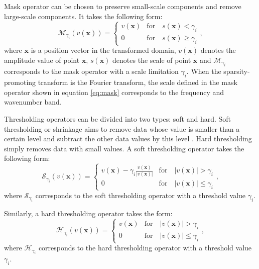 Mask operator can be chosen to preserve small-scale components and remove large-scale components. It takes the following form:
\begin{equation}
\label{eq:mask}
\mathbf{\mathcal{M}}_{\gamma_i}(v(\mathbf{x})) = \left\{ \begin{array}{ll}
v(\mathbf{x}) & \text{for}\quad  s(\mathbf{x}) < \gamma_i  \\
0	      & \text{for}\quad  s(\mathbf{x}) \ge \gamma_i
\end{array}\right.,
\end{equation}
where $\mathbf{x}$ is a position vector in the transformed domain, $v(\mathbf{x})$ denotes the amplitude value of point $\mathbf{x}$, $s(\mathbf{x})$ denotes the scale of point $\mathbf{x}$ and $\mathbf{\mathcal{M}}_{\gamma_i}$ corresponds to the mask operator with a scale limitation $\gamma_i$. When the sparsity-promoting transform is the Fourier transform, the scale defined in the mask operator shown in equation \ref{eq:mask} corresponds to the frequency and wavenumber band.

Thresholding operators can be divided into two types: soft and hard. Soft thresholding or shrinkage aims to remove data whose value is smaller than a certain level and subtract the other data values by this level \cite[]{donoho1995}. Hard thresholding simply removes data with small values. A soft thresholding operator takes the following form:
\begin{equation}
\label{eq:soft}
\mathbf{\mathcal{S}}_{\gamma_i}(v(\mathbf{x})) = \left\{ \begin{array}{ll}
v(\mathbf{x})-\gamma_i \frac{v(\mathbf{x})}{|v(\mathbf{x})|} & \text{for}\quad  |v(\mathbf{x})| > \gamma_i  \\
0			      & \text{for}\quad  |v(\mathbf{x})| \le \gamma_i
\end{array}\right.,
\end{equation}
where $\mathbf{\mathcal{S}}_{\gamma_i}$ corresponds to the soft thresholding operator with a threshold value $\gamma_i$.

Similarly, a hard thresholding operator takes the form:
\begin{equation}
\label{eq:hard}
\mathbf{\mathcal{H}}_{\gamma_i}(v(\mathbf{x})) = \left\{ \begin{array}{ll}
v(\mathbf{x})  & \text{for}\quad  |v(\mathbf{x})| > \gamma_i  \\
0			      & \text{for}\quad |v(\mathbf{x})|  \le \gamma_i
\end{array}\right.,
\end{equation}
where $\mathbf{\mathcal{H}}_{\gamma_i}$ corresponds to the hard thresholding operator with a threshold value $\gamma_i$.

